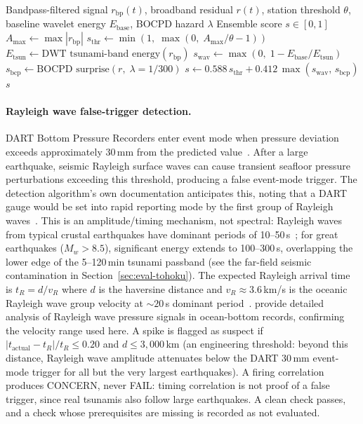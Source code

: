 \documentclass{article}
\begin{document}
\begin{algorithm}[t]
\caption{Ensemble Anomaly Scoring (per sliding window)}
\label{alg:scoring}
\begin{algorithmic}[1]
\REQUIRE Bandpass-filtered signal $r_\text{bp}(t)$, broadband residual $r(t)$,
  station threshold $\theta$, baseline wavelet energy $E_\text{base}$,
  BOCPD hazard $\lambda$
\ENSURE Ensemble score $s \in [0,1]$
\STATE $A_\text{max} \leftarrow \max|r_\text{bp}|$
\STATE $s_\text{thr} \leftarrow \min(1,\;\max(0,\; A_\text{max}/\theta - 1))$
\STATE $E_\text{tsun} \leftarrow \text{DWT tsunami-band energy}(r_\text{bp})$
\STATE $s_\text{wav} \leftarrow \max(0,\; 1 - E_\text{base}/E_\text{tsun})$
\STATE $s_\text{bcp} \leftarrow \text{BOCPD surprise}(r,\; \lambda{=}1/300)$
\STATE $s \leftarrow 0.588\, s_\text{thr} + 0.412\, \max(s_\text{wav},\, s_\text{bcp})$
\RETURN $s$
\end{algorithmic}
\end{algorithm}

\paragraph{Rayleigh wave false-trigger detection.}
DART Bottom Pressure Recorders enter event mode when pressure
deviation exceeds approximately 30\,mm from the predicted
value~\citep{bernard2011history}.
After a large earthquake, seismic Rayleigh surface waves can cause
transient seafloor pressure perturbations exceeding this threshold,
producing a false event-mode trigger.  The detection algorithm's own
documentation anticipates this, noting that a DART gauge would be set
into rapid reporting mode by the first group of Rayleigh
waves~\citep{mofjeld1997tsunami}. This is an amplitude/timing
mechanism, not spectral: Rayleigh waves from typical crustal earthquakes
have dominant periods of 10--50\,s~\citep{lay1995modern}; for great
earthquakes ($M_w > 8.5$), significant energy extends to 100--300\,s,
overlapping the lower edge of the 5--120\,min tsunami passband
(see the far-field seismic contamination in
Section~\ref{sec:eval-tohoku}).
The expected Rayleigh arrival time is
$t_R = d / v_R$ where $d$ is the haversine distance and
$v_R \approx 3.6$\,km/s is the oceanic Rayleigh wave group
velocity at ${\sim}20$\,s dominant period~\citep{lay1995modern}.
\citet{kubota2020ultrabroadband} provide detailed analysis of Rayleigh
wave pressure signals in ocean-bottom records, confirming the velocity
range used here. A spike is flagged as suspect if
$|t_\text{actual} - t_R| / t_R \leq 0.20$ and $d \leq 3{,}000$\,km
(an engineering threshold: beyond this distance, Rayleigh wave
amplitude attenuates below the DART 30\,mm event-mode trigger for
all but the very largest earthquakes).
A firing correlation produces CONCERN, never FAIL: timing
correlation is not proof of a false trigger, since real tsunamis also
follow large earthquakes.  A clean check passes, and a check whose
prerequisites are missing is recorded as not evaluated.
\end{document}

